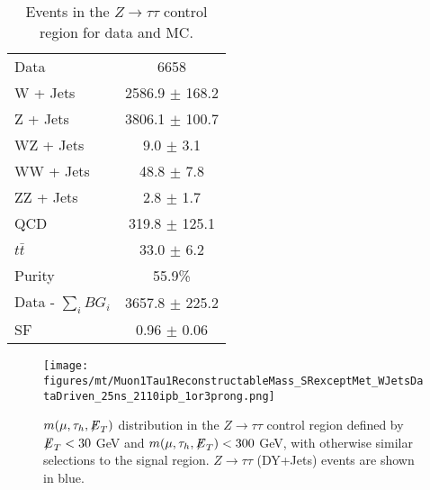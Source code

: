 \begin{table}[htbp!]
\begin{center}
 \caption{ Events in the $Z\rightarrow\tau\tau$ control region for data and MC.}
 \begin{tabular}{| l | c |}
 \hline\hline
Data & 6658 \\
W + Jets & 2586.9 $\pm$ 168.2 \\
Z + Jets & 3806.1 $\pm$ 100.7 \\
WZ + Jets & 9.0 $\pm$ 3.1 \\
WW + Jets & 48.8 $\pm$ 7.8 \\
ZZ + Jets & 2.8 $\pm$ 1.7 \\
QCD & 319.8 $\pm$ 125.1 \\
$t\bar{t}$ & 33.0 $\pm$ 6.2 \\ \hline
Purity & 55.9\% \\
Data - $\sum\limits_{i} BG_{i}$ & 3657.8 $\pm$ 225.2 \\ \hline
SF & 0.96 $\pm$ 0.06 \\
 \hline
 \hline
 \end{tabular}
 \label{table:theztautauControlTable}
\end{center}
\end{table}

\begin{figure}
\begin{center}
\texttt{[image: figures/mt/Muon1Tau1ReconstructableMass\_SRexceptMet\_WJetsDataDriven\_25ns\_2110ipb\_1or3prong.png]}
\caption{ $m(\mu,\tau_{h},{\not\mathrel{E}}_T)$ distribution in the $Z \to \tau\tau$ control region defined by ${\not\mathrel{E}}_T < 30$ GeV and $m(\mu,\tau_{h},{\not\mathrel{E}}_T) < 300$ GeV, with 
otherwise similar selections to the signal region. $Z \to \tau\tau$ (DY+Jets) events are shown in blue.}
\label{fig:ZtautauControlPlots}
\end{center}
\end{figure}

